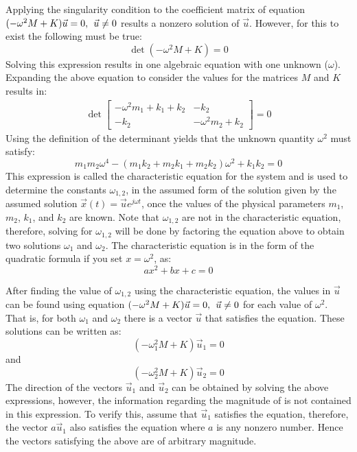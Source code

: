 \documentclass[12pt,letter]{article}
\numberwithin{ex}{section} %
\numberwithin{re}{section} %
\begin{document}
Applying the singularity condition to the coefficient matrix of equation $(-\omega^2 M  + K)\vec{u} =0, \hspace{1ex} \vec{u}\neq0$ results a nonzero solution of $\vec{u}$. However, for this to exist the following must be true:
\begin{equation}
\det(-\omega^2 M  + K) = 0
\end{equation}
Solving this expression results in one algebraic equation with one unknown ($\omega$). Expanding the above equation to consider the values for the matrices $M$ and $K$ results in:
\begin{eqnarray}
\det\begin{bmatrix} -\omega^2 m_1 + k_1 + k_2 & -k_2  \\  -k_2 & -\omega^2 m_2 + k_2 \end{bmatrix}=0
\end{eqnarray}
Using the definition of the determinant yields that the unknown quantity $\omega^2$ must satisfy:
\begin{equation}
m_1 m_2 \omega^4 - (m_1 k_2 + m_2 k_1 + m_2 k_2)\omega^2 + k_1 k_2 = 0
\end{equation}
This expression is called the characteristic equation for the system and is used to determine the constants $\omega_{1,2}$, in the assumed form of the solution given by the assumed solution $\vec{x}(t) = \vec{u}e^{j\omega t}$, once the values of the physical parameters $m_1$, $m_2$, $k_1$, and $k_2$ are known. Note that $\omega_{1,2}$ are not in the characteristic equation, therefore, solving for $\omega_{1,2}$  will be done by factoring the equation above to obtain two solutions $\omega_1$ and $\omega_2$. The characteristic equation is in the form of the quadratic formula if you set $x=\omega^2$, as:
\begin{equation}
ax^2 + bx +c = 0
\end{equation}

After finding the value of $\omega_{1,2}$ using the characteristic equation, the values in $\vec{u}$ can be found using equation $(-\omega^2 M  + K)\vec{u} =0, \hspace{1ex} \vec{u}\neq0$ for each value of $\omega^2$. That is, for both $\omega_1$ and $\omega_2$ there is a vector  $\vec{u}$ that satisfies the equation. These solutions can be written as:
\begin{equation}
	(-\omega_1^2 M  + K)\vec{u}_1 =0
\end{equation}
and 
\begin{equation}
	(-\omega_2^2 M  + K)\vec{u}_2 =0
\end{equation}
The direction of the vectors $\vec{u}_1$ and $\vec{u}_2$ can be obtained by solving the above expressions, however, the information regarding the magnitude of is not contained in this expression. To verify this, assume that $\vec{u}_1$ satisfies the equation, therefore, the vector $a\vec{u}_1$ also satisfies the equation where $a$ is any nonzero number. Hence the vectors satisfying the above are of arbitrary magnitude.
 
\end{document}
